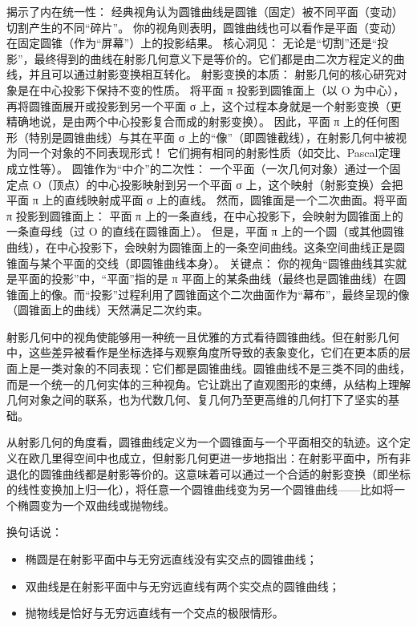 揭示了内在统一性：
经典视角认为圆锥曲线是圆锥（固定）被不同平面（变动）切割产生的不同“碎片”。
你的视角则表明，圆锥曲线也可以看作是平面（变动）在固定圆锥（作为“屏幕”）上的投影结果。
核心洞见： 无论是“切割”还是“投影”，最终得到的曲线在射影几何意义下是等价的。它们都是由二次方程定义的曲线，并且可以通过射影变换相互转化。
射影变换的本质：
射影几何的核心研究对象是在中心投影下保持不变的性质。
将平面 π 投影到圆锥面上（以 O 为中心），再将圆锥面展开或投影到另一个平面 σ 上，这个过程本身就是一个射影变换（更精确地说，是由两个中心投影复合而成的射影变换）。
因此，平面 π 上的任何图形（特别是圆锥曲线）与其在平面 σ 上的“像”（即圆锥截线），在射影几何中被视为同一个对象的不同表现形式！ 它们拥有相同的射影性质（如交比、Pascal定理成立性等）。
圆锥作为“中介”的二次性：
一个平面（一次几何对象）通过一个固定点 O（顶点）的中心投影映射到另一个平面 σ 上，这个映射（射影变换）会把平面 π 上的直线映射成平面 σ 上的直线。
然而，圆锥面是一个二次曲面。将平面 π 投影到圆锥面上：
平面 π 上的一条直线，在中心投影下，会映射为圆锥面上的一条直母线（过 O 的直线在圆锥面上）。
但是，平面 π 上的一个圆（或其他圆锥曲线），在中心投影下，会映射为圆锥面上的一条空间曲线。这条空间曲线正是圆锥面与某个平面的交线（即圆锥曲线本身）。
关键点： 你的视角“圆锥曲线其实就是平面的投影”中，“平面”指的是 π 平面上的某条曲线（最终也是圆锥曲线）在圆锥面上的像。而“投影”过程利用了圆锥面这个二次曲面作为“幕布”，最终呈现的像（圆锥面上的曲线）天然满足二次约束。


射影几何中的视角使能够用一种统一且优雅的方式看待圆锥曲线。但在射影几何中，这些差异被看作是坐标选择与观察角度所导致的表象变化，它们在更本质的层面上是一类对象的不同表现：它们都是圆锥曲线。圆锥曲线不是三类不同的曲线，而是一个统一的几何实体的三种视角。它让跳出了直观图形的束缚，从结构上理解几何对象之间的联系，也为代数几何、复几何乃至更高维的几何打下了坚实的基础。

从射影几何的角度看，圆锥曲线定义为一个圆锥面与一个平面相交的轨迹。这个定义在欧几里得空间中也成立，但射影几何更进一步地指出：在射影平面中，所有非退化的圆锥曲线都是射影等价的。这意味着可以通过一个合适的射影变换（即坐标的线性变换加上归一化），将任意一个圆锥曲线变为另一个圆锥曲线——比如将一个椭圆变为一个双曲线或抛物线。

换句话说：
\begin{itemize}
\item 椭圆是在射影平面中与无穷远直线没有实交点的圆锥曲线；
\item 双曲线是在射影平面中与无穷远直线有两个实交点的圆锥曲线；
\item 抛物线是恰好与无穷远直线有一个交点的极限情形。
\end{itemize}

